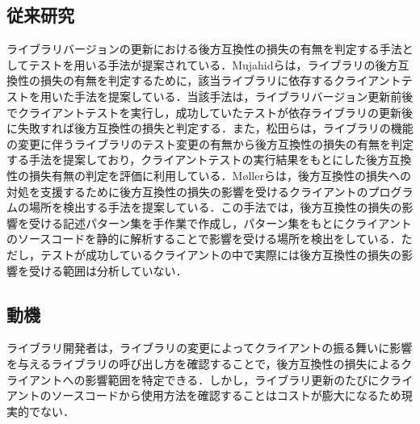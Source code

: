 \documentclass[T,J]{fose} %
\newcommand{\todo}[1]{\colorbox{yellow}{{\bf TODO}:}{\color{red} {\textbf{[#1]}}}}
\begin{document}

\subsection{従来研究}
ライブラリバージョンの更新における後方互換性の損失の有無を判定する手法としてテストを用いる手法が提案されている\cite{mujahid1}\cite{matsuda}．Mujahidらは，ライブラリの後方互換性の損失の有無を判定するために，該当ライブラリに依存するクライアントテストを用いた手法を提案している\cite{mujahid}．当該手法は，ライブラリバージョン更新前後でクライアントテストを実行し，成功していたテストが依存ライブラリの更新後に失敗すれば後方互換性の損失と判定する．また，松田らは，ライブラリの機能の変更に伴うライブラリのテスト変更の有無から後方互換性の損失の有無を判定する手法を提案しており，クライアントテストの実行結果をもとにした後方互換性の損失有無の判定を評価に利用している\cite{matsuda}．M{\o}llerらは，後方互換性の損失への対処を支援するために後方互換性の損失の影響を受けるクライアントのプログラムの場所を検出する手法を提案している\cite{10.1145/3428255}．この手法では，後方互換性の損失の影響を受ける記述パターン集を手作業で作成し，パターン集をもとにクライアントのソースコードを静的に解析することで影響を受ける場所を検出をしている．ただし，テストが成功しているクライアントの中で実際には後方互換性の損失の影響を受ける範囲は分析していない．

\subsection{動機}
ライブラリ開発者は，ライブラリの変更によってクライアントの振る舞いに影響を与えるライブラリの呼び出し方を確認することで，後方互換性の損失によるクライアントへの影響範囲を特定できる．しかし，ライブラリ更新のたびにクライアントのソースコードから使用方法を確認することはコストが膨大になるため現実的でない．
\end{document}
